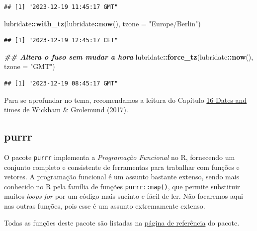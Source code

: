 \documentclass[
]{article}
\newenvironment{Shaded}{\begin{snugshade}}{\end{snugshade}}
\newcommand{\AttributeTok}[1]{\textcolor[rgb]{0.13,0.29,0.53}{#1}}
\newcommand{\DocumentationTok}[1]{\textcolor[rgb]{0.56,0.35,0.01}{\textbf{\textit{#1}}}}
\newcommand{\FunctionTok}[1]{\textcolor[rgb]{0.13,0.29,0.53}{\textbf{#1}}}
\newcommand{\NormalTok}[1]{#1}
\newcommand{\SpecialCharTok}[1]{\textcolor[rgb]{0.81,0.36,0.00}{\textbf{#1}}}
\newcommand{\StringTok}[1]{\textcolor[rgb]{0.31,0.60,0.02}{#1}}
\begin{document}
\begin{verbatim}
## [1] "2023-12-19 11:45:17 GMT"
\end{verbatim}

\begin{Shaded}
\begin{Highlighting}[]
\NormalTok{lubridate}\SpecialCharTok{::}\FunctionTok{with\_tz}\NormalTok{(lubridate}\SpecialCharTok{::}\FunctionTok{now}\NormalTok{(), }\AttributeTok{tzone =} \StringTok{"Europe/Berlin"}\NormalTok{)}
\end{Highlighting}
\end{Shaded}

\begin{verbatim}
## [1] "2023-12-19 12:45:17 CET"
\end{verbatim}

\begin{Shaded}
\begin{Highlighting}[]
\DocumentationTok{\#\# Altera o fuso sem mudar a hora}
\NormalTok{lubridate}\SpecialCharTok{::}\FunctionTok{force\_tz}\NormalTok{(lubridate}\SpecialCharTok{::}\FunctionTok{now}\NormalTok{(), }\AttributeTok{tzone =} \StringTok{"GMT"}\NormalTok{)}
\end{Highlighting}
\end{Shaded}

\begin{verbatim}
## [1] "2023-12-19 08:45:17 GMT"
\end{verbatim}

Para se aprofundar no tema, recomendamos a leitura do Capítulo \href{https://r4ds.had.co.nz/dates-and-times.html}{16 Dates and times} de Wickham \& Grolemund (2017).

\hypertarget{purrr}{%
\subsection{purrr}\label{purrr}}

O pacote \texttt{purrr} implementa a \emph{Programação Funcional} no R, fornecendo um conjunto completo e consistente de ferramentas para trabalhar com funções e vetores. A programação funcional é um assunto bastante extenso, sendo mais conhecido no R pela família de funções \texttt{purrr::map()}, que permite substituir muitos \emph{loops for} por um código mais sucinto e fácil de ler. Não focaremos aqui nas outras funções, pois esse é um assunto extremamente extenso.

Todas as funções deste pacote são listadas na \href{https://purrr.tidyverse.org/reference/index.html}{página de referência} do pacote.
\end{document}
